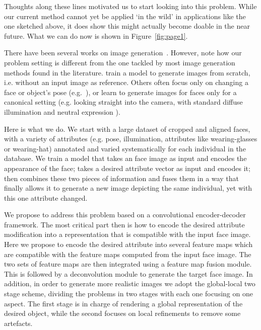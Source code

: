\documentclass[10pt,twocolumn,letterpaper]{article}
\begin{document}
Thoughts along these lines motivated us to start looking into this problem.
While our current method cannot yet be applied ‘in the wild’ in applications like the one sketched above, it does show this might actually become doable in the near future. 
What we can do now is shown in Figure~\ref{fig:page1}.

There have been several works on image generation~\cite{Dosovitskiy-cvpr15, Denton-nips15, Gauthier-14, Goodfellow-nips14, Hinton-icann11, Kingma-iclr14, Kulkarni-nips15, Li-icml15, Rezende-icml14, Tieleman-Thesis, Yang-nips15, Yim-cvpr15, zhu2013deep, zhu-nips14}. 
However, note how our problem setting is different from the one tackled by most image generation methods found in the literature. 
\cite{Denton-nips15, Gauthier-14, Goodfellow-nips14, Li-icml15} train a model to generate images from scratch, i.e. without an input image as reference.
Others often focus only on changing a face or object’s pose (e.g.~\cite{Dosovitskiy-cvpr15,Yang-nips15}), or learn to generate images for faces only for a canonical setting (e.g. looking straight into the camera, with standard diffuse illumination and neutral expression \cite{Yim-cvpr15,zhu2013deep}). 

Here is what we do.
We start with a large dataset of cropped and aligned faces, with a variety of attributes (e.g. pose, illumination, attributes like wearing-glasses or wearing-hat) annotated and varied systematically for each individual in the database.
We train a model that takes an face image as input and encodes the appearance of the face; takes a desired attribute vector as input and encodes it; then combines these two pieces of information and fuses them in a way that finally allows it to generate a new image depicting the same individual, yet with this one attribute changed. 

We propose to address this problem based on a convolutional encoder-decoder framework. 
The most critical part then is how to encode the desired attribute modification into a representation that is compatible with the input face image. 
Here we propose to encode the desired attribute into several feature maps which are compatible with the feature maps computed from the input face image. 
The two sets of feature maps are then integrated using a feature map fusion module. 
This is followed by a deconvolution module to generate the target face image.
In addition, in order to generate more realistic images we adopt the global-local two stage scheme, dividing the problems in two stages with each one focusing on one aspect. The first stage is in charge of rendering a global representation of the desired object, while the second focuses on local refinements to remove some artefacts.
\end{document}
